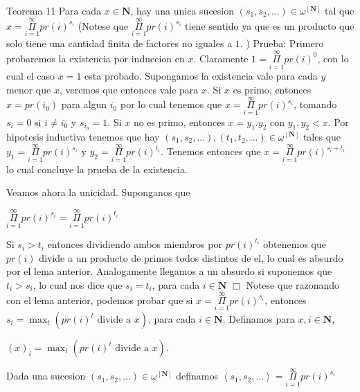 Teorema 11 Para cada \(x\in \mathbf{N}\), hay una unica sucesion \((s_{1},s_{2},...)\in \omega ^{\left[ \mathbf{N}\right] }\) tal que
\(\displaystyle x=\underset{i=1}{\overset{\infty }{\Pi }}pr(i)^{s_{i}} \)
(Notese que \(\underset{i=1}{\overset{\infty }{\Pi }}pr(i)^{s_{i}}\) tiene sentido ya que es un producto que solo tiene una cantidad finita de factores no iguales a \(1\). )
Prueba: Primero probaremos la existencia por induccion en \(x\). Claramente \(1= \underset{i=1}{\overset{\infty }{\Pi }}pr(i)^{0}\), con lo cual el caso \(x=1\) esta probado. Supongamos la existencia vale para cada \(y\) menor que \(x\), veremos que entonces vale para \(x\). Si \(x\) es primo, entonces \(x=pr(i_{0})\) para algun \(i_{0}\) por lo cual tenemos que \(x=\underset{i=1}{\overset{\infty }{\Pi }}pr(i)^{s_{i}}\), tomando \(s_{i}=0\) si \(i\neq i_{0}\) y \(s_{i_{0}}=1\). Si \(x\) no es primo, entonces \(x=y_{1}.y_{2}\) con \(y_{1},y_{2}< x\). Por hipotesis inductiva tenemos que hay \((s_{1},s_{2},...),(t_{1},t_{2},...)\in \omega ^{\left[ \mathbf{N}\right] }\) tales que \(y_{1}=\underset{i=1}{\overset {\infty }{\Pi }}pr(i)^{s_{i}}\) y \(y_{2}=\underset{i=1}{\overset{\infty }{\Pi }}pr(i)^{t_{i}}\). Tenemos entonces que \(x=\underset{i=1}{\overset{\infty }{ \Pi }}pr(i)^{s_{i}+t_{i}}\) lo cual concluye la prueba de la existencia.

Veamos ahora la unicidad. Suponganos que

\(\displaystyle \underset{i=1}{\overset{\infty }{\Pi }}pr(i)^{s_{i}}=\underset{i=1}{\overset{ \infty }{\Pi }}pr(i)^{t_{i}} \)

Si \(s_{i} >t_{i}\) entonces dividiendo ambos miembros por \(pr(i)^{t_{i}}\) obtenemos que \(pr(i)\) divide a un producto de primos todos distintos de el, lo cual es absurdo por el lema anterior. Analogamente llegamos a un absurdo si suponemos que \(t_{i} >s_{i}\), lo cual nos dice que \(s_{i}=t_{i}\), para cada \(i\in \mathbf{N}\) \(\Box\)
Notese que razonando con el lema anterior, podemos probar que si \(x=\underset {i=1}{\overset{\infty }{\Pi }}pr(i)^{s_{i}}\), entonces \(s_{i}=\max_{t}\left( pr(i)^{t}\text{ divide a }x\right) \), para cada \(i\in \mathbf{N}\). Definamos para \(x,i\in \mathbf{N}\),

\(\displaystyle (x)_{i}=\max_{t}\left( pr(i)^{t}\text{ divide a }x\right) . \)

Dada una sucesion \((s_{1},s_{2},...)\in \omega ^{\left[ \mathbf{N}\right] }\) definamos
\(\displaystyle \left\langle s_{1},s_{2},...\right\rangle =\underset{i=1}{\overset{\infty }{ \Pi }}pr(i)^{s_{i}} \)

